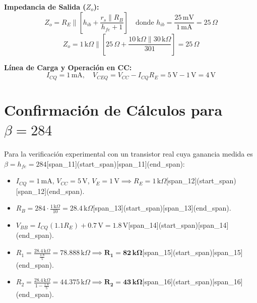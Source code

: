 \documentclass[12pt, a4paper]{article}
\begin{document}
\textbf{Impedancia de Salida ($Z_o$):}
\[
Z_o = R_E \parallel \left[ h_{ib} + \frac{r_s \parallel R_B}{h_{fe} + 1} \right] \quad \text{donde } h_{ib} = \frac{25\,\text{mV}}{1\,\text{mA}} = 25\,\Omega
\]
\[
Z_o = 1\,\text{k}\Omega \parallel \left[ 25\,\Omega + \frac{10\,\text{k}\Omega \parallel 30\,\text{k}\Omega}{301} \right] = 25\,\Omega
\]

\textbf{Línea de Carga y Operación en CC:}
\[
I_{CQ} = 1\,\text{mA}, \quad V_{CEQ} = V_{CC} - I_{CQ} R_E = 5\,\text{V} - 1\,\text{V} = 4\,\text{V}
\]

\section{Confirmación de Cálculos para $\beta = 284$}
Para la verificación experimental con un transistor real cuya ganancia medida es $\beta = h_{fe} = 284$[span_11](start_span)[span_11](end_span):
\begin{itemize}
    \item $I_{CQ} = 1\,\text{mA}$, $V_{CC} = 5\,\text{V}$, $V_E = 1\,\text{V} \implies R_E = 1\,\text{k}\Omega$[span_12](start_span)[span_12](end_span).
    \item $R_B = 284 \cdot \frac{1\,\text{k}\Omega}{10} = 28.4\,\text{k}\Omega$[span_13](start_span)[span_13](end_span).
    \item $V_{BB} = I_{CQ}(1.1 R_E) + 0.7\,\text{V} = 1.8\,\text{V}$[span_14](start_span)[span_14](end_span).
    \item $R_1 = \frac{28.4\,\text{k}\Omega}{\frac{1.8}{5}} = 78.888\,\text{k}\Omega \implies \mathbf{R_1 = 82\,\text{k}\Omega}$[span_15](start_span)[span_15](end_span).
    \item $R_2 = \frac{28.4\,\text{k}\Omega}{1 - \frac{1.8}{5}} = 44.375\,\text{k}\Omega \implies \mathbf{R_2 = 43\,\text{k}\Omega}$[span_16](start_span)[span_16](end_span).
\end{itemize}
\end{document}
